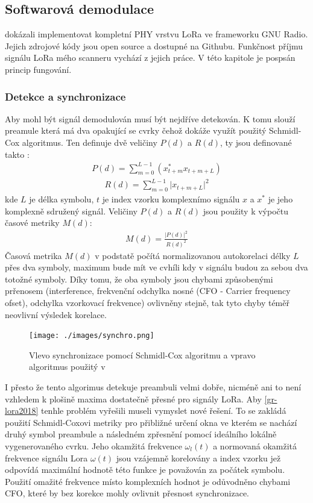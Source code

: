 \documentclass{ctuthesis}
\begin{document}
\subsection{Softwarová demodulace} \label{sec:softdem}
\cite{gr-lora2018} dokázali implementovat kompletní PHY vrstvu LoRa ve frameworku GNU Radio. Jejich zdrojové kódy jsou open source a dostupné na Githubu. Funkčnost příjmu signálu LoRa mého scanneru vychází z jejich práce. V této kapitole je pospsán princip fungování.
\subsubsection{Detekce a synchronizace}
\label{subsec:detection}
Aby mohl být signál demodulován musí být nejdříve detekován. K tomu slouží preamule která má dva opakující se cvrky čehož dokáže využít použitý Schmidl-Cox algoritmus. Ten definuje dvě veličiny $P(d)$ a $R(d)$, ty jsou definované takto \cite{schmidlcox1997}:
\begin{align}P(d) = \sum_{m=0}^{L-1} (x_{t+m}^{\ast}x_{t+m+L})
\label{eq:lora3}
\end{align}
\begin{align}
R(d) = \sum_{m=0}^{L-1} \lvert{x_{t+m+L}}\rvert^{2}
\label{eq:lora4}
\end{align}
kde $L$ je délka symbolu, $t$ je index vzorku komplexnímo signálu $x$ a $x^{\ast}$ je jeho komplexně sdružený signál. Veličiny $P(d)$ a $R(d)$ jsou použity k výpočtu časové metriky $M(d)$:
\begin{align}
M(d) = \frac{\vert P(d) \rvert ^{2}}{R(d)^{2}}
\label{eq:lora5}
\end{align}
Časová metrika $M(d)$ v podstatě počítá normalizovanou autokorelaci délky $L$ přes dva symboly, maximum bude mít ve cvhíli kdy v signálu budou za sebou dva totožné symboly. Díky tomu, že oba symboly jsou chybami způsobenými prřenosem (interference, frekvenční odchylka nosné (CFO - Carrier frequency ofset), odchylka vzorkovací frekvence) ovlivněny stejně, tak tyto chyby téměř neovlivní výsledek korelace. \\
\begin{figure}
\caption{Vlevo synchronizace pomocí Schmidl-Cox algoritmu a vpravo algoritmus použitý v \cite{gr-lora2018}}
\texttt{[image: ./images/synchro.png]}
\label{fig:loraSyn}
\end{figure}
I přesto že tento algorimus detekuje preambuli velmi dobře, nicméně ani to není vzhledem k plošině maxima dostatečně přesné pro signály LoRa. Aby \ref{gr-lora2018} tenhle problém vyřešili museli vymyslet nové řešení. To se zakládá použití Schmidl-Coxovi metriky pro přibližné určení okna ve kterém se nachází druhý symbol preambule a následném zpřesnění pomocí ideálního lokálně vygenerovaného cvrku. Jeho okamžitá frekvence $\omega_{l}(t)$ a normovaná okamžitá frekvence signálu Lora  $\omega(t)$ jsou vzájemně korelovány a index vzorku jež odpovídá maximální hodnotě této funkce je považován za počátek symbolu. Použití omažité frekvence místo komplexních hodnot je odůvodněno chybami CFO, které by bez korekce mohly ovlivnit přesnost synchronizace.
\end{document}
